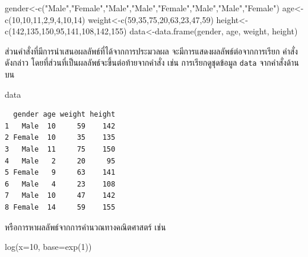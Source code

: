 \documentclass[
  a4paper,
]{book}
\newenvironment{Shaded}{\begin{snugshade}}{\end{snugshade}}
\newcommand{\AttributeTok}[1]{\textcolor[rgb]{0.40,0.45,0.13}{#1}}
\newcommand{\DecValTok}[1]{\textcolor[rgb]{0.68,0.00,0.00}{#1}}
\newcommand{\FunctionTok}[1]{\textcolor[rgb]{0.28,0.35,0.67}{#1}}
\newcommand{\NormalTok}[1]{\textcolor[rgb]{0.00,0.23,0.31}{#1}}
\newcommand{\OtherTok}[1]{\textcolor[rgb]{0.00,0.23,0.31}{#1}}
\newcommand{\StringTok}[1]{\textcolor[rgb]{0.13,0.47,0.30}{#1}}
\begin{document}
\begin{Shaded}
\begin{Highlighting}[]
\NormalTok{gender}\OtherTok{\textless{}{-}}\FunctionTok{c}\NormalTok{(}\StringTok{"Male"}\NormalTok{,}\StringTok{"Female"}\NormalTok{,}\StringTok{"Male"}\NormalTok{,}\StringTok{"Male"}\NormalTok{,}\StringTok{"Female"}\NormalTok{,}\StringTok{"Male"}\NormalTok{,}\StringTok{"Male"}\NormalTok{,}\StringTok{"Female"}\NormalTok{)}
\NormalTok{age}\OtherTok{\textless{}{-}}\FunctionTok{c}\NormalTok{(}\DecValTok{10}\NormalTok{,}\DecValTok{10}\NormalTok{,}\DecValTok{11}\NormalTok{,}\DecValTok{2}\NormalTok{,}\DecValTok{9}\NormalTok{,}\DecValTok{4}\NormalTok{,}\DecValTok{10}\NormalTok{,}\DecValTok{14}\NormalTok{)}
\NormalTok{weight}\OtherTok{\textless{}{-}}\FunctionTok{c}\NormalTok{(}\DecValTok{59}\NormalTok{,}\DecValTok{35}\NormalTok{,}\DecValTok{75}\NormalTok{,}\DecValTok{20}\NormalTok{,}\DecValTok{63}\NormalTok{,}\DecValTok{23}\NormalTok{,}\DecValTok{47}\NormalTok{,}\DecValTok{59}\NormalTok{)}
\NormalTok{height}\OtherTok{\textless{}{-}}\FunctionTok{c}\NormalTok{(}\DecValTok{142}\NormalTok{,}\DecValTok{135}\NormalTok{,}\DecValTok{150}\NormalTok{,}\DecValTok{95}\NormalTok{,}\DecValTok{141}\NormalTok{,}\DecValTok{108}\NormalTok{,}\DecValTok{142}\NormalTok{,}\DecValTok{155}\NormalTok{)}
\NormalTok{data}\OtherTok{\textless{}{-}}\FunctionTok{data.frame}\NormalTok{(gender, age, weight, height)}
\end{Highlighting}
\end{Shaded}

ส่วนคำสั่งที่มีการนำเสนอผลลัพธ์ที่ได้จากการประมวลผล จะมีการแสดงผลลัพธ์ต่อจากการเรียก
คำสั่งดังกล่าว โดยที่ส่วนที่เป็นผลลัพธ์จะขึ้นต่อท้ายจากคำสั่ง เช่น การเรียกดูชุดข้อมูล
\texttt{data} จากคำสั่งด้านบน

\begin{Shaded}
\begin{Highlighting}[]
\NormalTok{data }
\end{Highlighting}
\end{Shaded}

\begin{verbatim}
  gender age weight height
1   Male  10     59    142
2 Female  10     35    135
3   Male  11     75    150
4   Male   2     20     95
5 Female   9     63    141
6   Male   4     23    108
7   Male  10     47    142
8 Female  14     59    155
\end{verbatim}

หรือการหาผลลัพธ์จากการคำนวณทางคณิตศาสตร์ เช่น

\begin{Shaded}
\begin{Highlighting}[]
\FunctionTok{log}\NormalTok{(}\AttributeTok{x=}\DecValTok{10}\NormalTok{, }\AttributeTok{base=}\FunctionTok{exp}\NormalTok{(}\DecValTok{1}\NormalTok{))}
\end{Highlighting}
\end{Shaded}
\end{document}
